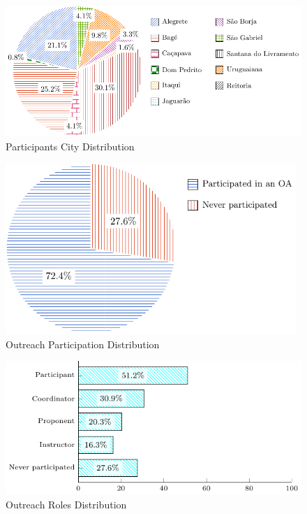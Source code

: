 \begin{figure}[!htb]
  \caption{Participants City Distribution}\label{fig:city-distribution}
  \begin{center}
    \includegraphics[width=14cm]{img/5-participants-city.pdf}
  \end{center}
\end{figure}

\begin{figure}[!htb]
  \caption{Outreach Participation Distribution}\label{fig:outreach-participation}
  \begin{center}
    \includegraphics[width=11cm]{img/5-outreach-participation.pdf}
  \end{center}
\end{figure}

\begin{figure}[!htb]
  \caption{Outreach Roles Distribution}\label{fig:outreach-roles}
  \begin{center}
    \includegraphics[width=13cm]{img/5-outreach-roles.pdf}
  \end{center}
\end{figure}

